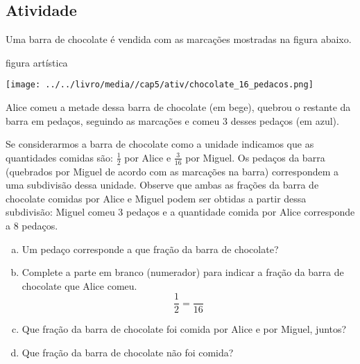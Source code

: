 \documentclass[a4,12pt]{book}
\begin{document}
\subsection{Atividade}


Uma barra de chocolate é vendida com as marcações mostradas na figura abaixo.
\begin{imagem*} [breakable]{}{} 
 figura artística
 
\texttt{[image: ../../livro/media//cap5/ativ/chocolate\_16\_pedacos.png]}
\end{imagem*}
 

Alice comeu a metade dessa barra de chocolate (em bege), quebrou o restante da barra em pedaços, seguindo as marcações e comeu 3 desses pedaços (em azul).

\begin{center}
\end{center}

Se considerarmos a barra de chocolate como a unidade indicamos que as quantidades comidas são: $\frac{1}{2}$ por Alice e $\frac{3}{16}$ por Miguel.
Os pedaços da barra (quebrados por Miguel de acordo com as marcações na barra) correspondem a uma subdivisão dessa unidade.
Observe que ambas as frações da barra de chocolate comidas por Alice e Miguel podem ser obtidas a partir dessa subdivisão: Miguel comeu 3 pedaços e a quantidade comida por Alice corresponde a 8 pedaços.
\begin{enumerate}[a)]
\item Um pedaço corresponde a que fração da barra de chocolate?
\item Complete a parte em branco (numerador) para indicar a fração da barra de chocolate que Alice comeu. $$\frac{1}{2} = \frac{ }{16}$$ 
\item Que fração da barra de chocolate foi comida por Alice e por Miguel, juntos?
\item  Que fração da barra de chocolate não foi comida?
\end{enumerate}
\end{document}
